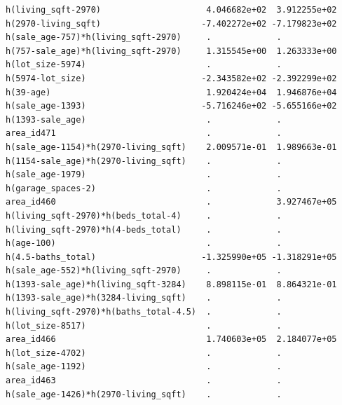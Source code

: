 \documentclass[
]{article}
\begin{document}
\begin{verbatim}
h(living_sqft-2970)                     4.046682e+02  3.912255e+02
h(2970-living_sqft)                    -7.402272e+02 -7.179823e+02
h(sale_age-757)*h(living_sqft-2970)     .             .           
h(757-sale_age)*h(living_sqft-2970)     1.315545e+00  1.263333e+00
h(lot_size-5974)                        .             .           
h(5974-lot_size)                       -2.343582e+02 -2.392299e+02
h(39-age)                               1.920424e+04  1.946876e+04
h(sale_age-1393)                       -5.716246e+02 -5.655166e+02
h(1393-sale_age)                        .             .           
area_id471                              .             .           
h(sale_age-1154)*h(2970-living_sqft)    2.009571e-01  1.989663e-01
h(1154-sale_age)*h(2970-living_sqft)    .             .           
h(sale_age-1979)                        .             .           
h(garage_spaces-2)                      .             .           
area_id460                              .             3.927467e+05
h(living_sqft-2970)*h(beds_total-4)     .             .           
h(living_sqft-2970)*h(4-beds_total)     .             .           
h(age-100)                              .             .           
h(4.5-baths_total)                     -1.325990e+05 -1.318291e+05
h(sale_age-552)*h(living_sqft-2970)     .             .           
h(1393-sale_age)*h(living_sqft-3284)    8.898115e-01  8.864321e-01
h(1393-sale_age)*h(3284-living_sqft)    .             .           
h(living_sqft-2970)*h(baths_total-4.5)  .             .           
h(lot_size-8517)                        .             .           
area_id466                              1.740603e+05  2.184077e+05
h(lot_size-4702)                        .             .           
h(sale_age-1192)                        .             .           
area_id463                              .             .           
h(sale_age-1426)*h(2970-living_sqft)    .             .           
                                                                  

\end{verbatim}
\end{document}
